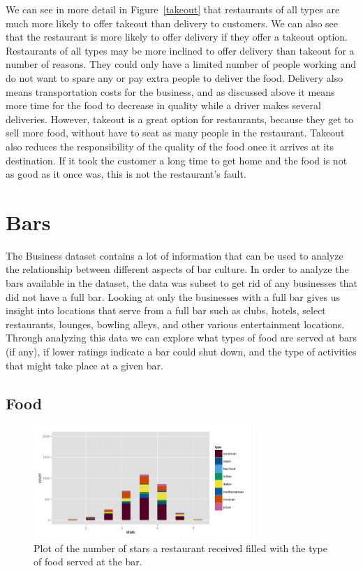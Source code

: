 \documentclass[11pt]{article}
\begin{document}
We can see in more detail in Figure~\ref{takeout} that restaurants of all types are much more likely to offer takeout than delivery to customers.  We can also see that the restaurant is more likely to offer delivery if they offer a takeout option.  Restaurants of all types may be more inclined to offer delivery than takeout for a number of reasons.  They could only have a limited number of people working and do not want to spare any or pay extra people to deliver the food.  Delivery also means transportation costs for the business, and as discussed above it means more time for the food to decrease in quality while a driver makes several deliveries.  However, takeout is a great option for restaurants, because they get to sell more food, without have to seat as many people in the restaurant.  Takeout also reduces the responsibility of the quality of the food once it arrives at its destination.  If it took the customer a long time to get home and the food is not as good as it once was, this is not the restaurant's fault.  



\section{Bars}

The Business dataset contains a lot of information that can be used to analyze the relationship between different aspects of bar culture.  In order to analyze the bars available in the dataset, the data was subset to get rid of any businesses that did not have a full bar.  Looking at only the businesses with a full bar gives us insight into locations that serve from a full bar such as clubs, hotels, select restaurants, lounges, bowling alleys, and other various entertainment locations.  Through analyzing this data we can explore what types of food are served at bars (if any), if lower ratings indicate a bar could shut down, and the type of activities that might take place at a given bar.

\subsection{Food}

\begin{figure}[h!]
  \caption{Plot of the number of stars a restaurant received filled with the type of food served at the bar.}
  \centering
  \label{food}
    \includegraphics[width=0.75\textwidth]{Figures/Food_bars.png}
\end{figure}
\end{document}
